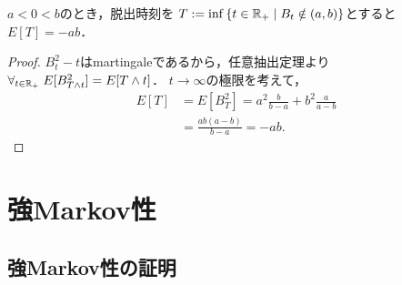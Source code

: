 \documentclass[uplatex,dvipdfmx]{jsreport}
\begin{document}
\begin{proposition}[脱出時刻の期待値]\label{prop-mean-of-Brownian-exit-time}
    $a<0<b$のとき，脱出時刻を
    $T:=\inf\left\{t\in\mathbb{R}_+\mid B_t\notin(a,b)\right\}$とすると$E[T]=-ab$．
\end{proposition}
\begin{proof}
    $B_t^2-t$はmartingaleであるから，任意抽出定理より$\forall_{t\in\mathbb{R}_+}\;E[B^2_{T\land t}]=E[T\land t]$．
    $t\to\infty$の極限を考えて，
    \begin{align*}
        E[T]&=E[B_T^2]=a^2\frac{b}{b-a}+b^2\frac{a}{a-b}\\
        &=\frac{ab(a-b)}{b-a}=-ab.
    \end{align*}
\end{proof}

\section{強Markov性}

\subsection{強Markov性の証明}
\end{document}

